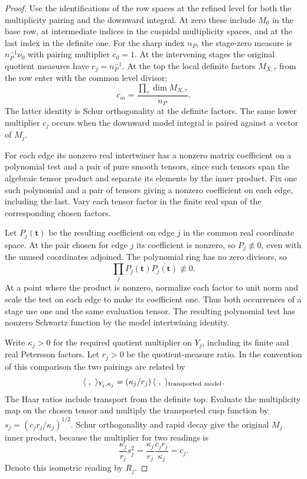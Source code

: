 \begin{proof}
Use the identifications of the row spaces at the refined level for both the multiplicity
pairing and the downward integral. At zero these include \(M_0\)
in the base row, at intermediate indices in the cuspidal
multiplicity spaces, and at the last index in the definite one.
For the sharp index \(n_P\), the stage-zero measure is
\(n_P^{-1}\nu_0\) with pairing multiplier \(c_0=1\).
At the intervening stages the original quotient measures
have \(c_j=n_P^{-1}\). At the top the local definite factors \(M_{X,\tau}\) from the row enter with the common level divisor:
\[
 c_m=\frac{\prod_\tau \dim M_{X,\tau}}{n_P}.
\] The latter
identity is Schur orthogonality at the definite factors.
The same lower multiplier \(c_j\) occurs when the downward
model integral is paired against a vector of \(M_j\).
\label{cor:level-four-core-1}

For each edge its nonzero real intertwiner has a nonzero
matrix coefficient on a polynomial test and a pair of pure
smooth tensors, since such tensors span the algebraic tensor
product and separate its elements by the inner product. Fix
one such polynomial and a pair of tensors giving a nonzero coefficient
on each edge, including the last. Vary each tensor factor in the
finite real span of the corresponding chosen factors.

Let \(P_j(\mathbf t)\) be the resulting coefficient on edge \(j\) in the
common real coordinate space. At the pair chosen for edge \(j\) its coefficient is nonzero, so
\(P_j\not\equiv0\), even with the unused coordinates adjoined.
The polynomial ring has no zero divisors, so
\[
 \prod_j P_j(\mathbf t)\overline{P_j(\mathbf t)}\not\equiv0 .
\] At a point where the product is nonzero,
normalize each factor to unit norm and scale the test on each
edge to make its coefficient one. Thus both occurrences of a
stage use one and the same evaluation tensor. The resulting
polynomial test has nonzero Schwartz function by the model
intertwining identity.

Write \(\kappa_j>0\) for the required quotient multiplier on
\(Y_j\), including its finite and real Petersson factors.
Let \(r_j>0\) be the quotient-measure ratio. In the convention of this comparison the two pairings are related by
\[
 \langle\ ,\ \rangle_{Y_j,\kappa_j}=(\kappa_j/r_j)\,\langle\ ,\ \rangle_{\rm transported\ model}.
\] The Haar ratios include transport from the definite
top. Evaluate the multiplicity map on the chosen tensor and
multiply the transported cusp function by
\(s_j=(c_jr_j/\kappa_j)^{1/2}\). Schur orthogonality and rapid
decay give the original \(M_j\) inner product, because the multiplier for two readings is
\[
 \frac{\kappa_j}{r_j}s_j^2
 =\frac{\kappa_j}{r_j}\frac{c_jr_j}{\kappa_j}=c_j .
\] Denote this isometric reading by \(R_j\).


\end{proof}
